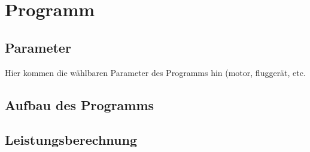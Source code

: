\chapter{Programm}
\label{chap:Programm}

\section{Parameter}
\label{sec:parameter}
Hier kommen die wählbaren Parameter des Programms hin (motor, fluggerät, etc.
\section{Aufbau des Programms}
\label{sec:aufbau_des_programms}
\blindtext[1]
\blindenumerate[3]
\section{Leistungsberechnung}
\label{sec:leistungsberechnung}
\blindtext[1]